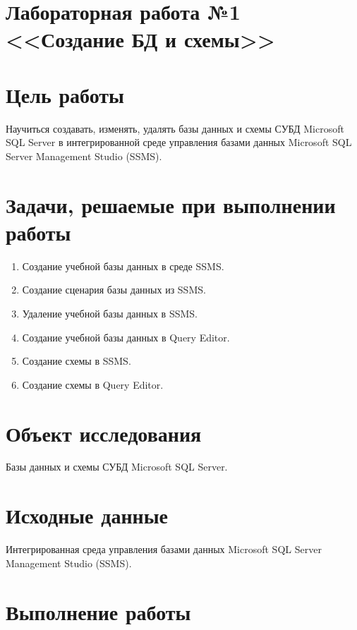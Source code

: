 \documentclass[a4paper, 14pt]{extarticle}
\begin{document}
\setcounter{page}{2}

\linespread{1.5}
\renewcommand{\baselinestretch}{1.5}

\section*{\large{Лабораторная работа №1 <<Создание БД и схемы>>}}

\section{Цель работы}

Научиться создавать, изменять, удалять базы данных и схемы СУБД Microsoft SQL
Server в интегрированной среде управления базами данных Microsoft SQL Server
Management Studio (SSMS).

\section{Задачи, решаемые при выполнении работы}

\begin{enumerate}[leftmargin=*]
  \item Создание учебной базы данных в среде SSMS.
  \item Создание сценария базы данных из SSMS.
  \item Удаление учебной базы данных в SSMS.
  \item Создание учебной базы данных в Query Editor.
  \item Создание схемы в SSMS.
  \item Создание схемы в Query Editor.
\end{enumerate}

\section{Объект исследования}

Базы данных и схемы СУБД Microsoft SQL Server.

\section{Исходные данные}

Интегрированная среда управления базами данных Microsoft SQL Server Management Studio (SSMS).

\section{Выполнение работы}
\end{document}
